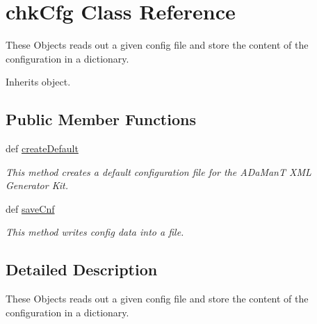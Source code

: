 \hypertarget{classtoolbox_1_1confbox_1_1chkCfg}{\section{chk\-Cfg Class Reference}
\label{classtoolbox_1_1confbox_1_1chkCfg}
}


These Objects reads out a given config file and store the content of the configuration in a dictionary.  




Inherits object.

\subsection*{Public Member Functions}
\begin{DoxyCompactItemize}
\item 
def \hyperlink{classtoolbox_1_1confbox_1_1chkCfg_a02d06cb883423f5dc68bedaaaa17b96d}{create\-Default}
\begin{DoxyCompactList}\small\item\em This method creates a default configuration file for the A\-Da\-Man\-T X\-M\-L Generator Kit. \end{DoxyCompactList}\item 
def \hyperlink{classtoolbox_1_1confbox_1_1chkCfg_a5ac943f85dee00502a4bdea6e2004760}{save\-Cnf}
\begin{DoxyCompactList}\small\item\em This method writes config data into a file. \end{DoxyCompactList}\end{DoxyCompactItemize}


\subsection{Detailed Description}
These Objects reads out a given config file and store the content of the configuration in a dictionary. 

